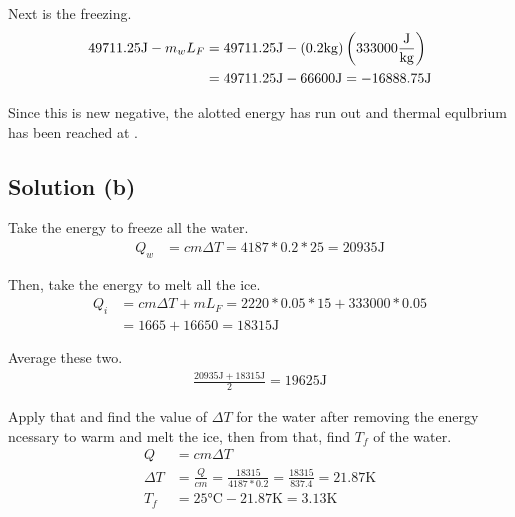 \documentclass[12pt]{article}
\begin{document}
            Next is the freezing.
            \begin{align}
                49711.25 \unit{\joule} - m_w L_F
                    &=  49711.25 \unit{\joule} - (0.2 \unit{\kilo\gram}) \left( 333000 \unit{\frac{\joule}{\kilo\gram}} \right)\\
                    &=  49711.25 \unit{\joule} - 66600 \unit{\joule}
                    =   -16888.75 \unit{\joule}
            \end{align}

            Since this is new negative, the alotted energy has run out and thermal equlbrium has been reached at \boxed{0\unit{\celsius}}. 

        \subsection{Solution (b)}
        Take the energy to freeze all the water.
        \begin{align}
            Q_w &=  cm \Delta T
                =   4187 * 0.2 * 25
                =   20935 \unit{\joule}
        \end{align}
        
        Then, take the energy to melt all the ice.
        \begin{align}
            Q_i &=  cm \Delta T + m L_F
                =   2220 * 0.05 * 15 + 333000 * 0.05\\
                &=  1665 + 16650
                =   18315 \unit{\joule}
        \end{align}

        Average these two. 
        \begin{align}
            \frac{20935 \unit{\joule} + 18315 \unit{\joule}}{2} = 19625 \unit{\joule}
        \end{align}

        Apply that and find the value of $\Delta T$ for the water after removing the energy ncessary to warm and melt the ice, then from that, find $T_f$ of the water. 
        \begin{align}
            Q   &=  cm \Delta T\\
            \Delta T    &=  \frac{Q}{cm}
                =   \frac{18315}{4187 * 0.2}
                =   \frac{18315}{837.4}
                =   21.87 \unit{\kelvin}\\
            T_f &=  25 \unit{\celsius} - 21.87 \unit{\kelvin}
                =   3.13 \unit{\kelvin}
        \end{align}
\end{document}
